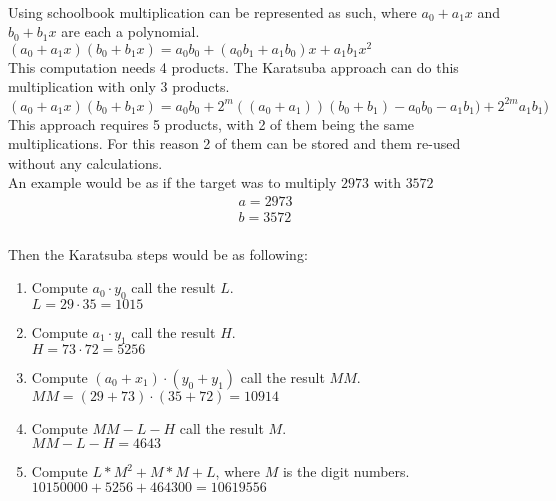\\
Using schoolbook multiplication can be represented as such, where $a_0 + a_1x$ and $b_0 + b_1x$ are each a polynomial.\\
$(a_0 + a_1 x)(b_0 + b_1 x) = a_0 b_0 + (a_0 b_1 + a_1 b_0 )x + a_1 b_1 x^2$\\
This computation needs 4 products. The Karatsuba approach can do this multiplication with only 3 products.\\
$(a_0 + a_1 x)(b_0 + b_1 x) = a_0 b_0 + 2^m ((a_0+a_1))(b_0 + b_1)-a_0 b_0 - a_1 b_1) + 2^{2m} a_1 b_1)$\\
This approach requires 5 products, with 2 of them being the same multiplications. For this reason 2 of them can be stored and them re-used without any calculations.\medskip
\\
An example would be as if the target was to multiply $2973$ with $3572$ \\
\begin{equation*}
    \begin{split}
        & a = 2973\\
        & b = 3572
    \end{split}
\end{equation*}\\
Then the Karatsuba steps would be as following:\\
\begin{enumerate}
    \item Compute $a_0 \cdot y_0$ call the result $L$.\\$L = 29 \cdot 35 = 1015$
    \item Compute $a_1 \cdot y_1$ call the result $H$.\\$H = 73 \cdot 72 = 5256$
    \item Compute $(a_0 + x_1) \cdot (y_0 + y_1)$ call the result $MM$.\\$MM = (29 + 73) \cdot (35 + 72) = 10914$
    \item Compute $MM - L - H$ call the result $M$.\\$MM - L - H = 4643$
    \item Compute $L * M^2 + M * M + L$, where $M$ is the digit numbers.\\$10150000 + 5256 + 464300 = 10619556$
\end{enumerate}
